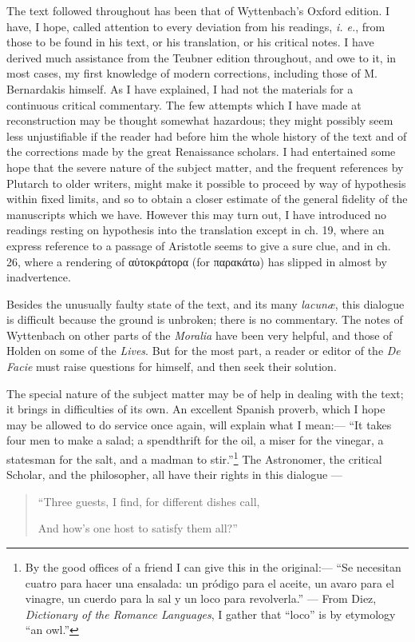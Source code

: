 \documentclass[a4paper, 11pt, oneside, polutonikogreek, english]{article}
\begin{document}
The text followed throughout has been that of Wyttenbach's Oxford edition. I have, I hope, called attention to every deviation from his readings, \emph{i. e.}, from those to be found in his text, or his translation, or his critical notes. I have derived much assistance from the Teubner edition throughout, and owe to it, in most cases, my first knowledge of modern corrections, including those of M. Bernardakis himself. As I have explained, I had not the materials for a continuous critical commentary. The few attempts which I have made at reconstruction may be thought somewhat hazardous; they might possibly seem less unjustifiable if the reader had before him the whole history of the text and of the corrections made by the great Renaissance scholars. I had entertained some hope that the severe nature of the subject matter, and the frequent references by Plutarch to older writers, might make it possible to proceed by way of hypothesis within fixed limits, and so to obtain a closer estimate of the general fidelity of the manuscripts which we have. However this may turn out, I have introduced no readings resting on hypothesis into the translation except in ch. 19, where an express reference to a passage of Aristotle seems to give a sure clue, and in ch. 26, where a rendering of αὐτοκράτορα (for παρακάτω) has slipped in almost by inadvertence.

Besides the unusually faulty state of the text, and its many \emph{lacunæ}, this dialogue is difficult because the ground is unbroken; there is no commentary. The notes of Wyttenbach on other parts of the \emph{Moralia} have been very helpful, and those of Holden on some of the \emph{Lives}. But for the most part, a reader or editor of the \emph{De Facie} must raise questions for himself, and then seek their solution. 

The special nature of the subject matter may be of help in dealing with the text; it brings in difficulties of its own. An excellent Spanish proverb, which I hope may be allowed to do service once again, will explain what I mean:--- ``It takes four men to make a salad; a spendthrift for the oil, a miser for the vinegar, a statesman for the salt, and a madman to stir.''\footnote{By the good offices of a friend I can give this in the original:--- ``Se necesitan cuatro para hacer una ensalada: un pródigo para el aceite, un avaro para el vinagre, un cuerdo para la sal y un loco para revolverla.'' --- From Diez, \emph{Dictionary of the Romance Languages}, I gather that ``loco'' is by etymology ``an owl.''} The Astronomer, the critical Scholar, and the philosopher, all have their rights in this dialogue ---
\begin{quotation}
``Three guests, I find, for different dishes call,

And how's one host to satisfy them all?''
\end{quotation}
\end{document}
